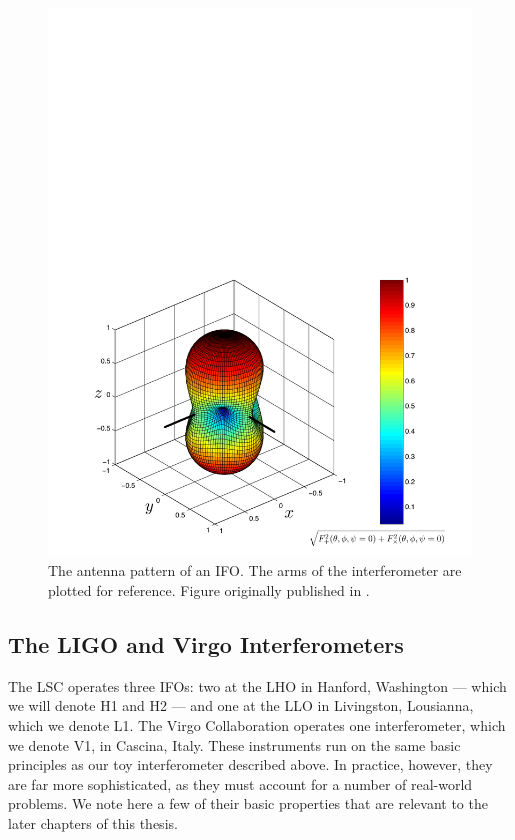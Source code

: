 \begin{figure}[p]
\center
\includegraphics[width=6in]{figures/beampattern.pdf}
\caption{The antenna pattern of an \ac{IFO}. The arms of the interferometer are plotted for reference. Figure originally published in \cite{Brown}.}
\label{fig:antenna_pattern}
\end{figure}

\subsection{The LIGO and Virgo Interferometers}
\label{sec:ligovirgo_interferometers}

The \ac{LSC} operates three \acp{IFO}: two at the \ac{LHO} in Hanford, Washington --- which we will denote H1 and H2 --- and one at the \ac{LLO} in Livingston, Lousianna, which we denote L1. The Virgo Collaboration operates one interferometer, which we denote V1, in Cascina, Italy. These instruments run on the same basic principles as our toy interferometer described above. In practice, however, they are far more sophisticated, as they must account for a number of real-world problems. We note here a few of their basic properties that are relevant to the later chapters of this thesis.

